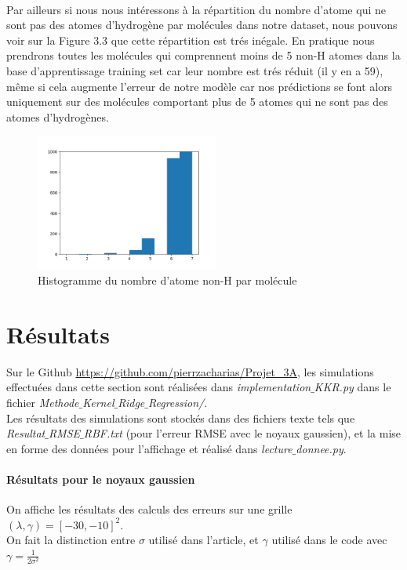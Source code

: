 \documentclass[a4paper,12pt,titlepage]{report}
\begin{document}
\paragraph{} 
Par ailleurs si nous nous intéressons à la répartition du nombre d'atome qui ne sont pas des atomes d'hydrogène par molécules dans notre dataset, nous pouvons voir sur la Figure 3.3 que cette répartition est trés inégale. En pratique nous prendrons toutes les molécules qui comprennent moins de 5 non-H atomes dans la base d'apprentissage training set car leur nombre est trés réduit (il y en a 59), même si cela augmente l'erreur de notre modèle car nos prédictions se font alors uniquement sur des molécules comportant plus de 5 atomes qui ne sont pas des atomes d'hydrogènes.
\begin{figure}[!h]
\begin{center}
		\includegraphics[height = 4.5cm, keepaspectratio]{graphes/non_H_atom.png}
		\caption{Histogramme du nombre d'atome non-H par molécule}
		\end{center}
\end{figure}

\section{Résultats}
Sur le Github \url{https://github.com/pierrzacharias/Projet_3A}, les simulations effectuées dans cette section sont réalisées dans \textit{implementation{$\_$}KKR.py} dans le fichier \textit{Methode{$\_$}Kernel{$\_$}Ridge{$\_$}Regression/}. \\
Les résultats des simulations sont stockés dans des fichiers texte tels que \\
\textit{Resultat{$\_$}RMSE{$\_$}RBF.txt} (pour l'erreur RMSE avec le noyaux gaussien), et la mise en forme des données pour l'affichage et réalisé dans  \textit{lecture{$\_$}donnee.py}.

\paragraph{Résultats pour le noyaux gaussien}
On affiche les résultats des calculs des erreurs sur une grille $(\lambda,\gamma) = [-30,-10]^2$. \\
On fait la distinction entre $\sigma$ utilisé dans l'article, et $\gamma$ utilisé dans le code avec $\gamma = \frac{1}{2\sigma^2}$
\end{document}
